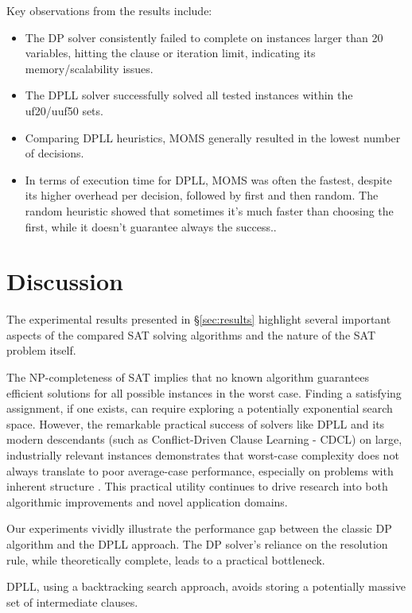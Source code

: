 \documentclass[12pt, a4paper]{article}
\begin{document}
Key observations from the results include:
\begin{itemize}
    \item The DP solver consistently failed to complete on instances larger than 20 variables, hitting the clause or iteration limit, indicating its memory/scalability issues.
    \item The DPLL solver successfully solved all tested instances within the uf20/uuf50 sets.
    \item Comparing DPLL heuristics, MOMS generally resulted in the lowest number of decisions.
    \item In terms of execution time for DPLL, MOMS was often the fastest, despite its higher overhead per decision, followed by first and then random. The random heuristic showed that sometimes it's much faster than choosing the first, while it doesn't guarantee always the success..
\end{itemize}

\section{Discussion}
\label{sec:discussion}

The experimental results presented in \S\ref{sec:results} highlight several important aspects of the compared SAT solving algorithms and the nature of the SAT problem itself.

The NP-completeness of SAT implies that no known algorithm guarantees efficient solutions for all possible instances in the worst case. Finding a satisfying assignment, if one exists, can require exploring a potentially exponential search space. However, the remarkable practical success of solvers like DPLL and its modern descendants (such as Conflict-Driven Clause Learning - CDCL) on large, industrially relevant instances demonstrates that worst-case complexity does not always translate to poor average-case performance, especially on problems with inherent structure \cite{Autoblocks}. This practical utility continues to drive research into both algorithmic improvements and novel application domains.

Our experiments vividly illustrate the performance gap between the classic DP algorithm and the DPLL approach. The DP solver's reliance on the resolution rule, while theoretically complete, leads to a practical bottleneck.

DPLL, using a backtracking search approach, avoids storing a potentially massive set of intermediate clauses.
\end{document}
